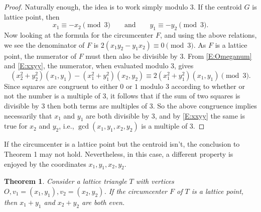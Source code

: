 \documentclass[10pt,preprint]{amsart}
\theoremstyle{plain}
\newtheorem{theorem}{Theorem}
\theoremstyle{definition}
\theoremstyle{remark}
\begin{document}
\begin{proof}
Naturally enough, the idea is  to work simply modulo $3$. If the centroid $G$ is lattice point, then 
\begin{equation}\label{E:xxyy}
x_1\equiv -x_2\pmod3\qquad\text{and}\qquad y_1\equiv -y_2\pmod3.
\end{equation}
Now looking at the formula for the circumcenter $F$,  and using the above relations,  we see the denominator of $F$ is $2(x_1 y_2-y_1 x_2) \equiv 0\pmod3$. As $F$ is a lattice point, the numerator of $F$ must then also be divisible by $3$.
From \eqref{E:Omeganum} and \eqref{E:xxyy}, the numerator, when evaluated modulo $3$,
 gives
\[
(x_2^2+y_2^2)(x_1,y_1) - (x_1^2+y_1^2)(x_2,y_2)\equiv 2(x_1^2+y_1^2)(x_1,y_1)\pmod3.
\]
Since squares are congruent to either $0$ or $1$ modulo $3$ according to whether or not the number is a multiple of $3$, it follows that if the sum of two squares is divisible by $3$ then both terms are multiples of $3$. So the above congruence implies necessarily that $x_1$ and $y_1$ are both divisible by $3$, and by  \eqref{E:xxyy} the same is true for $x_2$ and $y_2$, i.e., $\gcd(x_1,y_1,x_2,y_2)$ is a multiple of $3$.
\end{proof}



If the circumcenter is a lattice point but the centroid isn't, the conclusion to Theorem 1 may not hold. Nevertheless, in this case, a different property is enjoyed by the coordinates  $x_1,y_1,x_2,y_2$. 

\begin{theorem}
Consider a lattice triangle $T$ with vertices $O,v_1=(x_1,y_1),v_2=(x_2,y_2)$. 
If the circumcenter $F$ of  $T$ is a lattice point, then $x_1+y_1$ and  $x_2+y_2$ are both even.
\end{theorem}
\end{document}
